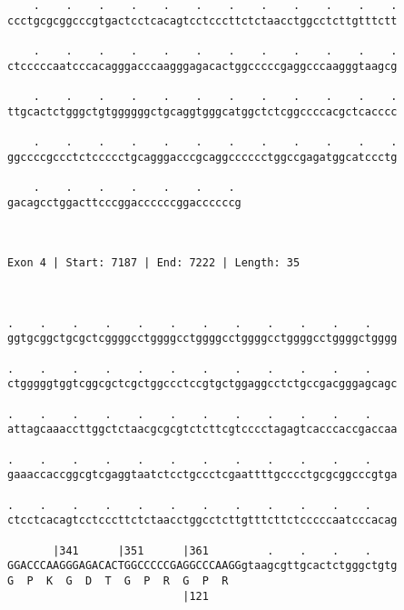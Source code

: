 \documentclass{article}
\begin{document}
\begin{Verbatim}
    .    .    .    .    .    .    .    .    .    .    .    .
ccctgcgcggcccgtgactcctcacagtcctcccttctctaacctggcctcttgtttctt
                                                            
    .    .    .    .    .    .    .    .    .    .    .    .
ctcccccaatcccacagggacccaagggagacactggcccccgaggcccaagggtaagcg
                                                            
    .    .    .    .    .    .    .    .    .    .    .    .
ttgcactctgggctgtggggggctgcaggtgggcatggctctcggccccacgctcacccc
                                                            
    .    .    .    .    .    .    .    .    .    .    .    .
ggccccgccctctccccctgcagggacccgcaggcccccctggccgagatggcatccctg
                                                            
    .    .    .    .    .    .    . 
gacagcctggacttcccggaccccccggaccccccg
                                    
                                    
 
Exon 4 | Start: 7187 | End: 7222 | Length: 35



.    .    .    .    .    .    .    .    .    .    .    .    
ggtgcggctgcgctcggggcctggggcctggggcctggggcctggggcctggggctgggg
                                                            
.    .    .    .    .    .    .    .    .    .    .    .    
ctgggggtggtcggcgctcgctggccctccgtgctggaggcctctgccgacgggagcagc
                                                            
.    .    .    .    .    .    .    .    .    .    .    .    
attagcaaaccttggctctaacgcgcgtctcttcgtcccctagagtcacccaccgaccaa
                                                            
.    .    .    .    .    .    .    .    .    .    .    .    
gaaaccaccggcgtcgaggtaatctcctgccctcgaattttgcccctgcgcggcccgtga
                                                            
.    .    .    .    .    .    .    .    .    .    .    .    
ctcctcacagtcctcccttctctaacctggcctcttgtttcttctcccccaatcccacag
                                                            
       |341      |351      |361         .    .    .    .    
GGACCCAAGGGAGACACTGGCCCCCGAGGCCCAAGGgtaagcgttgcactctgggctgtg
G  P  K  G  D  T  G  P  R  G  P  R                          
                           |121                             
  

\end{Verbatim}
\end{document}
